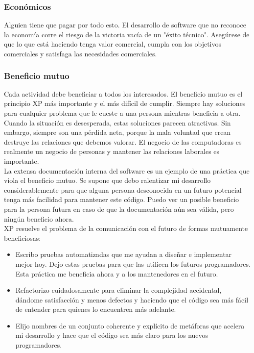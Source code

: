 \begin{spacing}{1.5}
		\subsubsection{Econ\'{o}micos}
			Alguien tiene que pagar por todo esto. El desarrollo de software que no reconoce la economía corre el riesgo de la victoria vacía de un "éxito técnico". Asegúrese de que lo que está haciendo tenga valor comercial, cumpla con los objetivos comerciales y satisfaga las necesidades comerciales.
		\subsubsection{Beneficio mutuo}
			Cada actividad debe beneficiar a todos los interesados. El beneficio mutuo es el principio XP más importante y el más difícil de cumplir. Siempre hay soluciones para cualquier problema que le cueste a una persona mientras beneficia a otra. Cuando la situación es desesperada, estas soluciones parecen atractivas. Sin embargo, siempre son una pérdida neta, porque la mala voluntad que crean destruye las relaciones que debemos valorar. El negocio de las computadoras es realmente un negocio de personas y mantener las relaciones laborales es importante.\\
			La extensa documentación interna del software es un ejemplo de una práctica que viola el beneficio mutuo. Se supone que debo ralentizar mi desarrollo considerablemente para que alguna persona desconocida en un futuro potencial tenga más facilidad para mantener este código. Puedo ver un posible beneficio para la persona futura en caso de que la documentación aún sea válida, pero ningún beneficio ahora.\\
			XP resuelve el problema de la comunicación con el futuro de formas mutuamente beneficiosas:
			\begin{itemize}
				\item Escribo pruebas automatizadas que me ayudan a diseñar e implementar mejor hoy. Dejo estas pruebas para que las utilicen los futuros programadores. Esta práctica me beneficia ahora y a los mantenedores en el futuro.
				\item Refactorizo cuidadosamente para eliminar la complejidad accidental, dándome satisfacción y menos defectos y haciendo que el código sea más fácil de entender para quienes lo encuentren más adelante.
				\item Elijo nombres de un conjunto coherente y explícito de metáforas que acelera mi desarrollo y hace que el código sea más claro para los nuevos programadores.
			\end{itemize}

\end{spacing}
